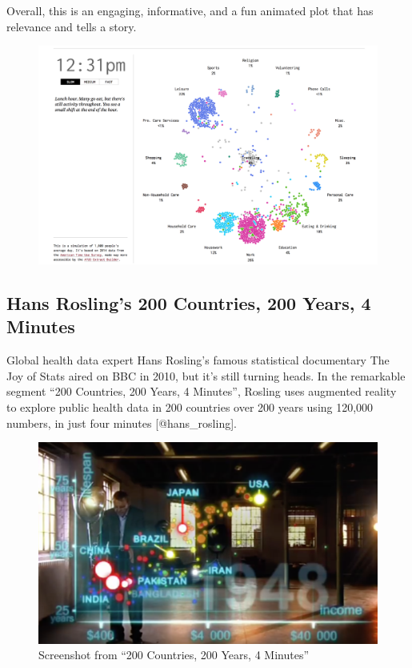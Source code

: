 \documentclass[]{book}
\theoremstyle{definition}
\theoremstyle{definition}
\theoremstyle{definition}
\theoremstyle{remark}
\begin{document}
Overall, this is an engaging, informative, and a fun animated plot that
has relevance and tells a story.

\begin{figure}
\centering
\includegraphics{images/life_of_americans.png}
\caption{}
\end{figure}

\subsection{Hans Rosling's 200 Countries, 200 Years, 4
Minutes}\label{hans-roslings-200-countries-200-years-4-minutes}

Global health data expert Hans Rosling's famous statistical documentary
The Joy of Stats aired on BBC in 2010, but it's still turning heads. In
the remarkable segment ``200 Countries, 200 Years, 4 Minutes'', Rosling
uses augmented reality to explore public health data in 200 countries
over 200 years using 120,000 numbers, in just four minutes
{[}@hans\_rosling{]}.

\begin{figure}
\centering
\includegraphics{images/200_countries_years.png}
\caption{Screenshot from ``200 Countries, 200 Years, 4 Minutes''}
\end{figure}
\end{document}
